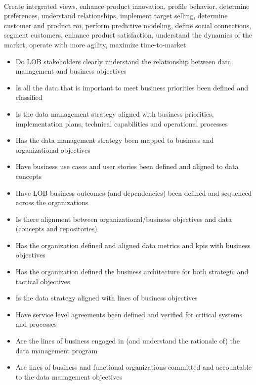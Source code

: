 ~\\

\begin{description}[nosep,font=\bfseries]

  \item [High-Level Business Goals]
  Create integrated views, enhance product innovation, profile behavior, 
  determine preferences, understand relationships, implement target selling, 
  determine customer and product \gls{roi}, perform predictive modeling,
  define social connections, segment customers, enhance product satisfaction, 
  understand the dynamics of the market, operate with more agility, 
  maximize time-to-market.
  ~\\
  \begin{itemize}
    \item Do LOB stakeholders clearly understand the relationship between data management and business objectives
    \item Is all the data that is important to meet business priorities been defined and classified
    \item Is the data management strategy aligned with business priorities, implementation plans,
          technical capabilities and operational processes
    \item Has the data management strategy been mapped to
          business and organizational objectives
    \item Have business use cases and user stories been defined and aligned to data concepts
    \item Have LOB business outcomes (and dependencies) been defined and sequenced across the organizations
    \item Is there alignment between organizational/business objectives and data (concepts and repositories)
    \item Has the organization defined and aligned data metrics and \glspl{kpi} with business objectives
    \item Has the organization defined the business architecture
          for both strategic and tactical objectives
    \item Is the data strategy aligned with lines of business objectives
    \item Have service level agreements been defined and verified for critical systems and processes
    \item Are the lines of business engaged in (and understand the rationale of) the data management program
    \item Are lines of business and functional organizations committed and accountable to the data management objectives
  \end{itemize}


\end{description}
